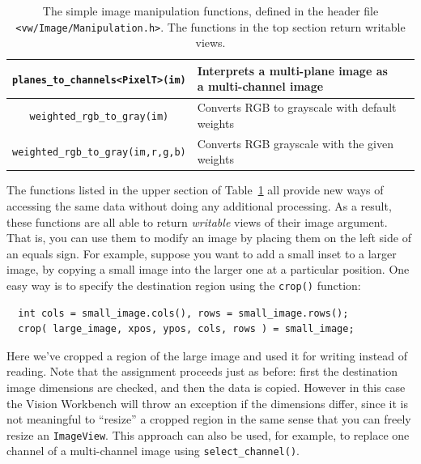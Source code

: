 \begin{table}[t]
\begin{centering}
\begin{tabular}{|c|l|l|}
\verb#planes_to_channels<PixelT>(im)# & Interprets a multi-plane image as a multi-channel image \\ \hline
\verb#weighted_rgb_to_gray(im)# & Converts RGB to grayscale with default weights \\ \hline
\verb#weighted_rgb_to_gray(im,r,g,b)# & Converts RGB grayscale with the given weights \\ \hline
\end{tabular}
\caption{The simple image manipulation functions, defined in the header file
{\tt <vw/Image/Manipulation.h>}.  The functions in the top section return writable views.}
\label{tbl:image-manipulation}
\end{centering}\end{table}

The functions listed in the upper section of Table~\ref{tbl:image-manipulation}
all provide new ways of accessing the same data without doing any additional
processing.  As a result, these functions are all able to return {\it writable}
views of their image argument.  That is, you can use them to modify an image by
placing them on the left side of an equals sign.  For example, suppose you want
to add a small inset to a larger image, by copying a small image into the larger
one at a particular position.  One easy way is to specify the destination region
using the \verb#crop()# function:
\begin{verbatim}
  int cols = small_image.cols(), rows = small_image.rows();
  crop( large_image, xpos, ypos, cols, rows ) = small_image;
\end{verbatim}
Here we've cropped a region of the large image and used it for writing
instead of reading.  Note that the assignment proceeds just as before:
first the destination image dimensions are checked, and then the data
is copied.  However in this case the Vision Workbench will throw an
exception if the dimensions differ, since it is not meaningful to
``resize'' a cropped region in the same sense that you can freely
resize an \verb#ImageView#.  This approach can also be used, for example,
to replace one channel of a multi-channel image using
\verb#select_channel()#.

